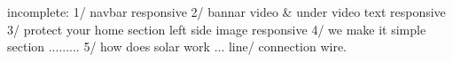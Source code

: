 incomplete:
1/ navbar responsive
2/ bannar video & under video text responsive
3/ protect your home section left side image responsive
4/ we make it simple section .........
5/ how does solar work ... line/ connection wire.